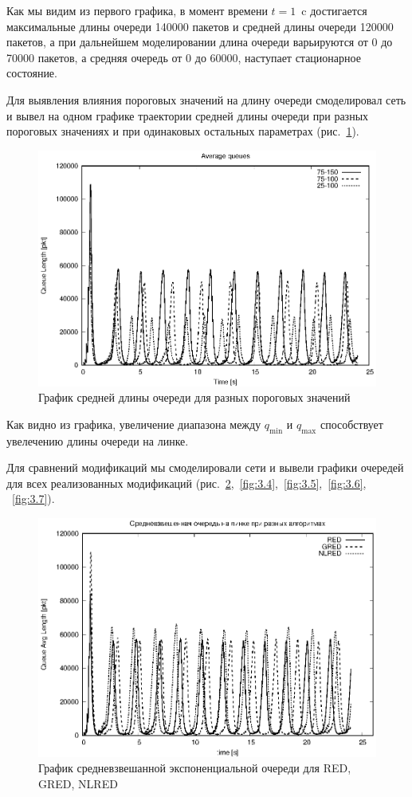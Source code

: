 Как мы видим из первого графика, в момент времени $t=1$~c достигается
максимальные длины очереди 140000 пакетов и средней длины очереди
120000 пакетов, а при дальнейшем моделировании длина очереди
варьируются от 0 до 70000 пакетов, а средняя очередь от 0 до 60000,
наступает стационарное состояние.

Для выявления влияния пороговых значений на длину очереди смоделировал
сеть и вывел на одном графике траектории  средней длины очереди при разных
пороговых значениях и при одинаковых остальных параметрах
(рис.~\ref{fig:3.2}).

\begin{figure}[!ht]
  \centering
  \includegraphics[width=0.7\linewidth]{image/av_queues_maxthresh.eps}
  \caption{График средней длины очереди для разных пороговых значений}
  \label{fig:3.2}
\end{figure}

Как видно из графика,
увеличение диапазона между $q_{\min}$ и $q_{\max}$ способствует
увелечению длины очереди на линке.

Для сравнений модификаций мы смоделировали сети и вывели графики очередей для всех реализованных модификаций
(рис.~\ref{fig:3.3},~\ref{fig:3.4},~\ref{fig:3.5},~\ref{fig:3.6}, ~\ref{fig:3.7}).


\begin{figure}[!ht]
  \centering
  \includegraphics[width=0.7\linewidth]{image/av_queues_1GNl.eps}
  \caption{График средневзвешанной экспоненциальной очереди для RED, GRED, NLRED}
  \label{fig:3.3}
\end{figure}

